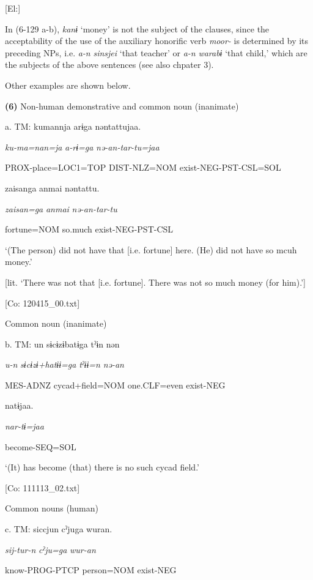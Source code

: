       [El:]

In (6-129 a-b), \textit{kanɨ} ‘money’ is not the subject of the clauses, since the acceptability of the use of the auxiliary honorific verb \textit{moor-} is determined by its preceding NPs, i.e. \textit{a-n} \textit{sinsjei} ‘that teacher’ or \textit{a-n} \textit{warabɨ} ‘that child,’ which are the subjects of the above sentences (see also chpater 3).

Other examples are shown below.

\textbf{(6)}  Non-human demonstrative and common noun (inanimate)

  a.  TM:  kumannja  arɨga  nəntattujaa.

      \textit{ku-ma=nan=ja}  \textit{a-rɨ=ga}  \textit{nə-an-tar-tu=jaa}

      PROX-place=LOC1=TOP  DIST-NLZ=NOM  exist-NEG-PST-CSL=SOL

      {\textbar}zaisan{\textbar}ga  anmai  nəntattu.

      \textit{zaisan=ga}  \textit{anmai}  \textit{nə-an-tar-tu}

      fortune=NOM  so.much  exist-NEG-PST-CSL

      ‘(The person) did not have that [i.e. fortune] here. (He) did not have so mcuh money.’

[lit. ‘There was not that [i.e. fortune]. There was not so much money (for him).’]

      [Co: 120415\_00.txt]

  Common noun (inanimate)

  b.  TM:  un  sɨcɨzɨbatɨga  tˀɨn  nən

      \textit{u-n}  \textit{sɨcɨzɨ+hatɨɨ=ga}  \textit{tˀɨɨ=n}  \textit{nə-an}

      MES-ADNZ  cycad+field=NOM  one.CLF=even  exist-NEG

      natɨjaa.

      \textit{nar-tɨ=jaa}

      become-SEQ=SOL

      ‘(It) has become (that) there is no such cycad field.’

      [Co: 111113\_02.txt]

  Common nouns (human)

  c.  TM:  siccjun  cˀjuga  wuran.

      \textit{sij-tur-n}  \textit{cˀju=ga}  \textit{wur-an}

      know-PROG-PTCP  person=NOM  exist-NEG


